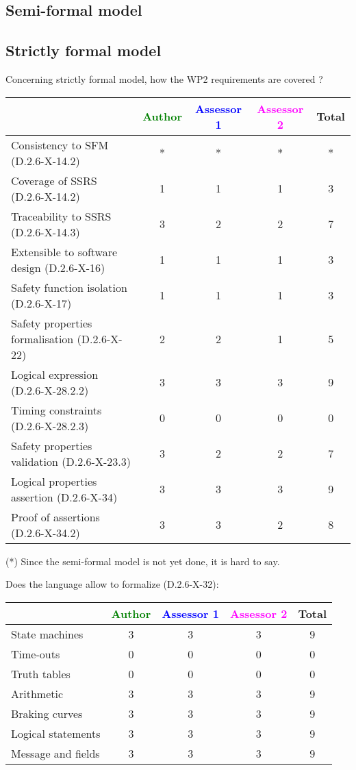 \subsection{Semi-formal model}

\begin{comment}
Section has been skipped.
\end{comment}

\subsection{Strictly formal model}

Concerning strictly formal model, how the WP2 requirements are covered ?

\begin{tabular}{|l | c | c | c | c|}
\hline
& \textcolor{green}{Author} & \textcolor{blue}{Assessor 1} & \textcolor{magenta}{Assessor 2} & Total \\
\hline 
Consistency to SFM (D.2.6-X-14.2) &* &* & *&  * \\
\hline
Coverage of SSRS (D.2.6-X-14.2)  &1 &1 & 1& 3  \\
\hline
Traceability to  SSRS (D.2.6-X-14.3)  &3 &2 & 2& 7 \\
\hline
Extensible to software design (D.2.6-X-16)  &1 &1 & 1& 3  \\
\hline
Safety function isolation (D.2.6-X-17)  &1 &1 & 1& 3 \\
\hline 
Safety properties formalisation (D.2.6-X-22)  &2 &2 & 1& 5 \\
\hline
Logical expression (D.2.6-X-28.2.2)  &3 &3 & 3& 9 \\
\hline
Timing constraints (D.2.6-X-28.2.3)  &0 &0 & 0& 0 \\
\hline
Safety properties validation (D.2.6-X-23.3)  &3 &2 & 2& 7 \\
\hline
Logical properties assertion (D.2.6-X-34)  &3 &3 & 3& 9 \\
\hline
Proof of assertions (D.2.6-X-34.2)  &3 &3 & 2& 8 \\
\hline
\end{tabular}

\begin{author_comment}
(*) Since the semi-formal model is not yet done, it is hard to say.
\end{author_comment}
Does the language allow to  formalize (D.2.6-X-32):

\begin{tabular}{|l | c | c | c | c|}
\hline
& \textcolor{green}{Author} & \textcolor{blue}{Assessor 1} & \textcolor{magenta}{Assessor 2} & Total \\
\hline 
State machines  &3 &3 & 3 & 9 \\
\hline
Time-outs  &0 &0 & 0& 0 \\
\hline
Truth tables  &0 &0 & 0& 0 \\
\hline
Arithmetic  &3 &3 & 3& 9 \\
\hline
Braking curves  &3 &3 & 3& 9 \\
\hline
Logical statements &3 &3 & 3& 9 \\
\hline
Message and fields &3 &3 & 3& 9 \\
\hline
\end{tabular}

